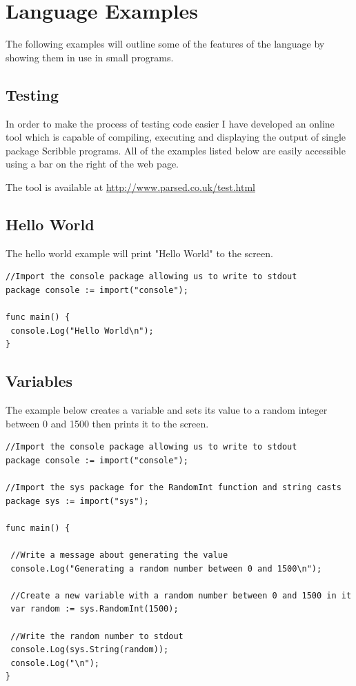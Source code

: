 \documentclass[]{final_report}
\begin{document}
\section{Language Examples}

The following examples will outline some of the features of the language by showing them in use in small programs.

\subsection{Testing}

In order to make the process of testing code easier I have developed an online tool which is capable of compiling, executing and displaying the output of single package Scribble programs. All of the examples listed below are easily accessible using a bar on the right of the web page.

The tool is available at \url{http://www.parsed.co.uk/test.html}

\subsection{Hello World}

The hello world example will print "Hello World" to the screen.

\begin{verbatim}
//Import the console package allowing us to write to stdout
package console := import("console");

func main() {
 console.Log("Hello World\n");
}
\end{verbatim}

\subsection{Variables}

The example below creates a variable and sets its value to a random integer between 0 and 1500 then prints it to the screen.

\begin{verbatim}
//Import the console package allowing us to write to stdout
package console := import("console");

//Import the sys package for the RandomInt function and string casts
package sys := import("sys");

func main() {

 //Write a message about generating the value
 console.Log("Generating a random number between 0 and 1500\n");
 
 //Create a new variable with a random number between 0 and 1500 in it
 var random := sys.RandomInt(1500);
 
 //Write the random number to stdout
 console.Log(sys.String(random));
 console.Log("\n");
}
\end{verbatim}
\end{document}
